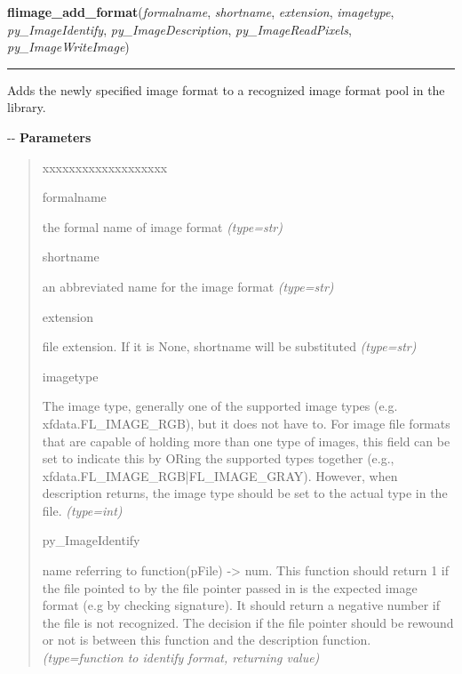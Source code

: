 \hspace{.8\funcindent}\begin{boxedminipage}{\funcwidth}

    \raggedright \textbf{flimage\_add\_format}(\textit{formalname}, \textit{shortname}, \textit{extension}, \textit{imagetype}, \textit{py\_ImageIdentify}, \textit{py\_ImageDescription}, \textit{py\_ImageReadPixels}, \textit{py\_ImageWriteImage})

    \vspace{-1.5ex}

    \rule{\textwidth}{0.5\fboxrule}
\setlength{\parskip}{2ex}

Adds the newly specified image format to a recognized image format
pool in the library.

-{}-
\setlength{\parskip}{1ex}
      \textbf{Parameters}
      \vspace{-1ex}

      \begin{quote}
        \begin{Ventry}{xxxxxxxxxxxxxxxxxxx}

          \item[formalname]


the formal name of image format
            {\it (type=str)}

          \item[shortname]


an abbreviated name for the image format
            {\it (type=str)}

          \item[extension]


file extension. If it is None, shortname will be substituted
            {\it (type=str)}

          \item[imagetype]


The image type, generally one of the supported image types (e.g.
xfdata.FL\_IMAGE\_RGB), but it does not have to. For image file formats
that are capable of holding more than one type of images, this field
can be set to indicate this by ORing the supported types together
(e.g., xfdata.FL\_IMAGE\_RGB|FL\_IMAGE\_GRAY). However, when description
returns, the image type should be set to the actual type in the file.
            {\it (type=int)}

          \item[py\_ImageIdentify]


name referring to function(pFile) -> num.
This function should return 1 if the file pointed to by the file
pointer passed in is the expected image format (e.g by checking
signature). It should return a negative number if the file is not
recognized. The decision if the file pointer should be rewound or not
is between this function and the description function.
            {\it (type=function to identify format, returning value)}


\end{Ventry}
\end{quote}
\end{boxedminipage}
